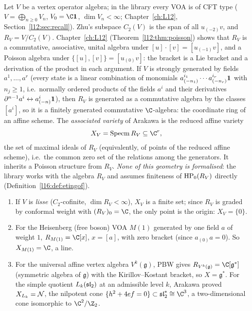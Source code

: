 Let $V$ be a vertex operator algebra; in the library every VOA is of CFT type
($V=\bigoplus_{n\ge0}V_n$, $V_0=\C\lsixteenvac$, $\dim V_n<\infty$; Chapter~\ref{ch:L12},
Section~\ref{l12:sec:recall}). Zhu's subspace $C_2(V)$ is the span of all $u_{(-2)}v$, and
$R_V = V/C_2(V)$. Chapter~\ref{ch:L12} (Theorem~\ref{l12:thm:poisson}) shows that $R_V$ is a
commutative, associative, unital algebra under $[u]\cdot[v] = [u_{(-1)}v]$, and a Poisson algebra under
$\{[u],[v]\} = [u_{(0)}v]$: the bracket is a Lie bracket and a derivation of the product in each
argument. If $V$ is strongly generated by fields $a^1,\dots,a^r$ (every state is a linear combination of
monomials $a^{i_1}_{(-n_1)}\cdots a^{i_r}_{(-n_r)}\mathbf{1}$ with $n_j\ge1$, i.e.\ normally ordered products of the
fields $a^i$ and their derivatives $\partial^{n-1}a^i\leftrightarrow a^i_{(-n)}\mathbf{1}$), then $R_V$ is generated as a commutative
algebra by the classes $[a^i]$, so it is a finitely generated commutative $\C$-algebra: the coordinate ring
of an affine scheme. The \emph{associated variety} of Arakawa is the reduced affine variety
\begin{equation*}
X_V = \operatorname{Specm} R_V \subseteq \C^r ,
\end{equation*}
the set of maximal ideals of $R_V$ (equivalently, of points of the reduced affine scheme), i.e.\ the common zero set of
the relations among the generators. It inherits a Poisson structure from $R_V$. \emph{None of this geometry is formalised}:
the library works with the algebra $R_V$ and assumes finiteness of $\mathrm{HP}_0(R_V)$ directly
(Definition~\ref{l16:def:etingof}).

\begin{example}\label{l16:ex:three}
\begin{enumerate}
\item If $V$ is \emph{lisse} ($C_2$-cofinite, $\dim R_V<\infty$), $X_V$ is a finite set; since $R_V$ is
  graded by conformal weight with $(R_V)_0 = \C$, the only point is the origin: $X_V=\{0\}$.
\item For the Heisenberg (free boson) VOA $M(1)$ generated by one field $a$ of weight $1$,
  $R_{M(1)} = \C[x]$, $x=[a]$, with zero bracket (since $a_{(0)}a = 0$). So $X_{M(1)} = \C$, a line.
\item For the universal affine vertex algebra $V^k(\mathfrak g)$, PBW gives $R_{V^k(\mathfrak g)} = \C[\mathfrak g^*]$
  (symmetric algebra of $\mathfrak g$) with the Kirillov--Kostant bracket, so $X = \mathfrak g^*$. For the simple
  quotient $L_k(\mathfrak{sl}_2)$ at an admissible level $k$, Arakawa proved $X_{L_k} = \mathcal{N}$, the
  nilpotent cone $\{h^2+4ef = 0\}\subset\lsixteensl^*\cong\C^3$, a two-dimensional cone isomorphic to
  $\C^2/\Z_2$.
\end{enumerate}
\end{example}

